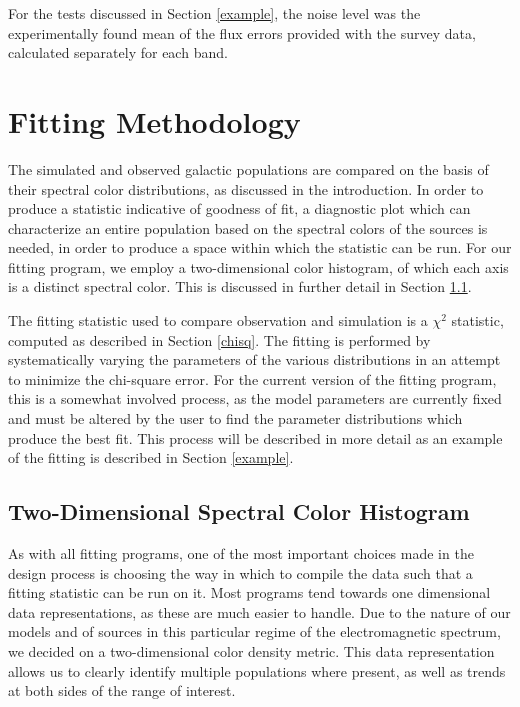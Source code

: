 \documentclass[twocolumn,letterpaper,10pt]{article}
\begin{document}
For the tests discussed in Section \ref{example}, the noise level was the experimentally found mean of the flux errors provided with the survey data, calculated separately for each band.

\section{Fitting Methodology}

The simulated and observed galactic populations are compared on the basis of their spectral color distributions, as discussed in the introduction. In order to produce a statistic indicative of goodness of fit, a diagnostic plot which can characterize an entire population based on the spectral colors of the sources is needed, in order to produce a space within which the statistic can be run. For our fitting program, we employ a two-dimensional color histogram, of which each axis is a distinct spectral color. This is discussed in further detail in Section \ref{color_hist}. 

The fitting statistic used to compare observation and simulation is a $\chi^2$ statistic, computed as described in Section \ref{chisq}. The fitting is performed by systematically varying the parameters of the various distributions in an attempt to minimize the chi-square error. For the current version of the fitting program, this is a somewhat involved process, as the model parameters are currently fixed and must be altered by the user to find the parameter distributions which produce the best fit. This process will be described in more detail as an example of the fitting is described in Section \ref{example}.

\subsection{Two-Dimensional Spectral Color Histogram}\label{color_hist}

As with all fitting programs, one of the most important choices made in the design process is choosing the way in which to compile the data such that a fitting statistic can be run on it. Most programs tend towards one dimensional data representations, as these are much easier to handle. Due to the nature of our models and of sources in this particular regime of the electromagnetic spectrum, we decided on a two-dimensional color density metric. This data representation allows us to clearly identify multiple populations where present, as well as trends at both sides of the range of interest.
\end{document}
